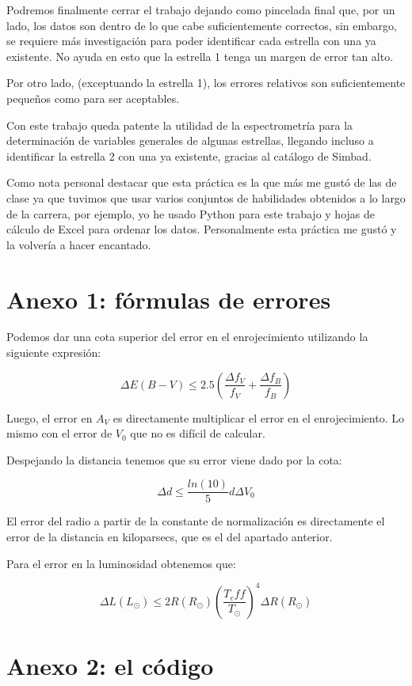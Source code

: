 \documentclass{aa} %
\begin{document}
Podremos finalmente cerrar el trabajo dejando como pincelada final que, por un lado, los datos son dentro de lo que cabe suficientemente correctos, sin embargo, se requiere más investigación para poder identificar cada estrella con una ya existente. No ayuda en esto que la estrella 1 tenga un margen de error tan alto.

Por otro lado, (exceptuando la estrella 1), los errores relativos son suficientemente pequeños como para ser aceptables.

Con este trabajo queda patente la utilidad de la espectrometría para la determinación de variables generales de algunas estrellas, llegando incluso a identificar la estrella 2 con una ya existente, gracias al catálogo de Simbad.

Como nota personal destacar que esta práctica es la que más me gustó de las de clase ya que tuvimos que usar varios conjuntos de habilidades obtenidos a lo largo de la carrera, por ejemplo, yo he usado Python para este trabajo y hojas de cálculo de Excel para ordenar los datos. Personalmente esta práctica me gustó y la volvería a hacer encantado.

\section{Anexo 1: fórmulas de errores}

Podemos dar una cota superior del error en el enrojecimiento utilizando la siguiente expresión:

$$
\Delta E(B-V) \leq 2.5 \left( \frac{\Delta f_V}{f_V} + \frac{\Delta f_B}{f_B} \right)
$$

Luego, el error en $A_V$ es directamente multiplicar el error en el enrojecimiento. Lo mismo con el error de $V_0$ que no es difícil de calcular.

Despejando la distancia tenemos que su error viene dado por la cota:

$$
\Delta d \leq \frac{ln(10)}{5} d \Delta V_0
$$

El error del radio a partir de la constante de normalización es directamente el error de la distancia en kiloparsecs, que es el del apartado anterior.

Para el error en la luminosidad obtenemos que:

$$
\Delta L(L_{\odot}) \leq 2R(R_{\odot}) \left( \frac{T_eff}{T_{\odot}} \right)^4 \Delta R (R_{\odot})
$$

\section{Anexo 2: el código}
\end{document}
